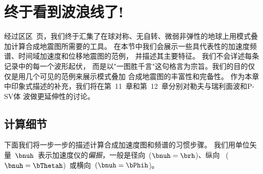 \section{终于看到波浪线了!}
\label{wiggly}
经过区区~\pageref{wiggly}页，我们终于汇集了在球对称、无自转、微弱非弹性的地球上用模式叠加计算合成地震图所需要的工具。
在本节中我们会展示一些具代表性的加速度频谱、时间域加速度和位移地震图的范例，
并描述其主要特征。
我们不会详述每条记录中的每一个波形起伏，
而是以"一图胜千言"这句格言为宗旨。我们的目的仅仅是用几个可见的范例来展示模式叠加
合成地震图的丰富性和完备性。
作为本章中印象式描述的补充，我们将在第~11~章和第~12~章分别对勒夫与瑞利面波和P-SV体
波做更延伸性的讨论。

\subsection{计算细节}

下面我们将一步一步的描述计算合成加速度图和频谱的习惯步骤。
%
%
%
我们用单位矢量~$\bnuh$~表示加速度仪的{\em 偏振\/}，一般是径向~($\bnuh=\brh$)、纵向 ~($\bnuh=\bThetah$)~或横向~$(\bnuh=\bPhih$)。

